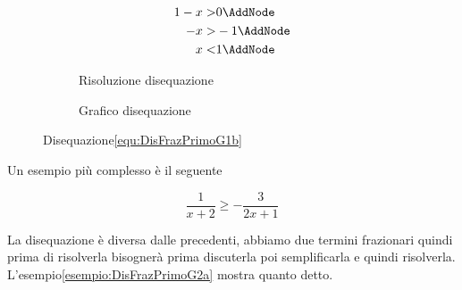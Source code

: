 \begin{figure}
	\centering
	\begin{subfigure}[]{\linewidth}
		\begin{NodesList}
			\centering
			\begin{align*}
				1-x>& 0\AddNode\\
				-x>&-1\AddNode\\
				x<&1\AddNode
			\end{align*}
			\LinkNodes[margin=6cm]{}%
			\LinkNodes[margin=6cm]{}%
		\end{NodesList}
		\caption{Risoluzione disequazione}
		\label{svo:DisFrazPrimoGìb}
	\end{subfigure}%
	\qquad
	\begin{subfigure}[]{\linewidth}
		\centering
		\caption{Grafico disequazione}
		\label{graf:DisFrazPrimoG1b}
	\end{subfigure}%
	\captionsetup{format=esempio,list=no}
	\caption{Disequazione\nobs\vref{equ:DisFrazPrimoG1b}}
	\label{esempio:DisFrazPrimoG1b}
\end{figure}

Un esempio più complesso è il seguente
\begin{esempiot}{}{}
\begin{equation}
\dfrac{1}{x+2}\geq-\dfrac{3}{2x+1}\label{equ:DisFrazPrimoG2}
\end{equation}
\end{esempiot}

La disequazione è diversa dalle precedenti, abbiamo due termini frazionari quindi prima di risolverla bisognerà prima discuterla poi semplificarla e quindi  risolverla. L'esempio\nobs\vref{esempio:DisFrazPrimoG2a} mostra quanto detto. 

